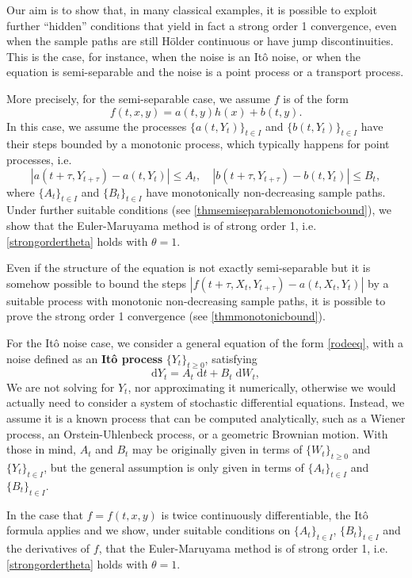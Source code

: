 \documentclass[reqno,12pt]{amsart}
\theoremstyle{plain}%
\theoremstyle{definition}
\begin{document}
Our aim is to show that, in many classical examples, it is possible to exploit further ``hidden'' conditions that yield in fact a strong order 1 convergence, even when the sample paths are still H\"older continuous or have jump discontinuities. This is the case, for instance, when the noise is an It\^o noise, or when the equation is semi-separable and the noise is a point process or a transport process.

More precisely, for the semi-separable case, we assume $f$ is of the form 
\[
    f(t, x, y) = a(t, y)h(x) + b(t, y).  
\]
In this case, we assume the processes $\{a(t, Y_t)\}_{t\in I}$ and $\{b(t, Y_t)\}_{t\in I}$ have their steps bounded by a monotonic process, which typically happens for point processes, i.e.
\[
|a(t+\tau, Y_{t+\tau}) - a(t, Y_t)| \leq A_t, \quad |b(t+\tau, Y_{t+\tau}) - b(t, Y_t)| \leq B_t,
\]
where $\{A_t\}_{t\in I}$ and $\{B_t\}_{t\in I}$ have monotonically non-decreasing sample paths. Under further suitable conditions (see \cref{thmsemiseparablemonotonicbound}), we show that the Euler-Maruyama method is of strong order 1, i.e. \eqref{strongordertheta} holds with $\theta=1$.

Even if the structure of the equation is not exactly semi-separable but it is somehow possible to bound the steps $|f(t+\tau, X_t, Y_{t+\tau}) - a(t, X_t, Y_t)|$ by a suitable process with monotonic non-decreasing sample paths, it is possible to prove the strong order 1 convergence (see \cref{thmmonotonicbound}).

For the It\^o noise case, we consider a general equation of the form \eqref{rodeeq}, with a noise defined as an \textbf{It\^o process} $\{Y_t\}_{t\geq 0}$, satisfying
\begin{equation}
  \mathrm{d}Y_t = A_t \;\mathrm{d}t + B_t \;\mathrm{d}W_t,
\end{equation}
We are not solving for $Y_t$, nor approximating it numerically, otherwise we would actually need to consider a system of stochastic differential equations. Instead, we assume it is a known process that can be computed analytically, such as a Wiener process, an Orstein-Uhlenbeck process, or a geometric Brownian motion. With those in mind, $A_t$ and $B_t$ may be originally given in terms of $\{W_t\}_{t\geq 0}$ and $\{Y_t\}_{t\in I}$, but the general assumption is only given in terms of $\{A_t\}_{t\in I}$ and $\{B_t\}_{t\in I}$.

In the case that $f=f(t, x, y)$ is twice continuously differentiable, the It\^o formula applies and we show, under suitable conditions on $\{A_t\}_{t\in I}$, $\{B_t\}_{t\in I}$ and the derivatives of $f$, that the Euler-Maruyama method is of strong order 1, i.e. \eqref{strongordertheta} holds with $\theta=1$.
\end{document}
